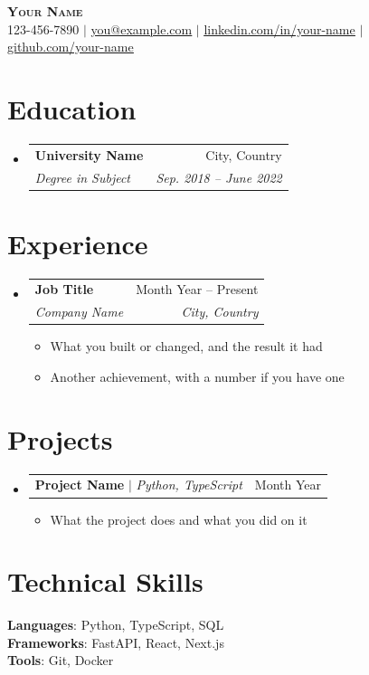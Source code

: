 \documentclass[letterpaper,11pt]{article}
\makeatletter
\newcommand{\resumeItem}[1]{
  \item\small{
    {#1 \vspace{-2pt}}
  }
}
\newcommand{\resumeSubheading}[4]{
  \vspace{-2pt}\item
    \begin{tabular*}{0.97\textwidth}[t]{l@{\extracolsep{\fill}}r}
      \textbf{#1} & #2 \\
      \textit{\small#3} & \textit{\small #4} \\
    \end{tabular*}\vspace{-7pt}
}
\newcommand{\resumeProjectHeading}[2]{
    \item
    \begin{tabular*}{0.97\textwidth}{l@{\extracolsep{\fill}}r}
      \small#1 & #2 \\
    \end{tabular*}\vspace{-7pt}
}
\newcommand{\resumeSubHeadingListStart}{\begin{itemize}[leftmargin=0.15in, label={}]}
\newcommand{\resumeSubHeadingListEnd}{\end{itemize}}
\newcommand{\resumeItemListStart}{\begin{itemize}}
\newcommand{\resumeItemListEnd}{\end{itemize}\vspace{-5pt}}
\makeatother
\begin{document}
\begin{center}
    \textbf{\Huge \scshape Your Name} \\ \vspace{1pt}
    \small 123-456-7890 $|$ \href{mailto:you@example.com}{\underline{you@example.com}} $|$
    \href{https://linkedin.com/in/your-name}{\underline{linkedin.com/in/your-name}} $|$
    \href{https://github.com/your-name}{\underline{github.com/your-name}}
\end{center}


\section{Education}
  \resumeSubHeadingListStart
    \resumeSubheading
      {University Name}{City, Country}
      {Degree in Subject}{Sep. 2018 -- June 2022}
  \resumeSubHeadingListEnd


\section{Experience}
  \resumeSubHeadingListStart

    \resumeSubheading
      {Job Title}{Month Year -- Present}
      {Company Name}{City, Country}
      \resumeItemListStart
        \resumeItem{What you built or changed, and the result it had}
        \resumeItem{Another achievement, with a number if you have one}
      \resumeItemListEnd

  \resumeSubHeadingListEnd


\section{Projects}
    \resumeSubHeadingListStart
      \resumeProjectHeading
          {\textbf{Project Name} $|$ \emph{Python, TypeScript}}{Month Year}
          \resumeItemListStart
            \resumeItem{What the project does and what you did on it}
          \resumeItemListEnd
    \resumeSubHeadingListEnd


\section{Technical Skills}
 \begin{itemize}[leftmargin=0.15in, label={}]
    \small{\item{
     \textbf{Languages}{: Python, TypeScript, SQL} \\
     \textbf{Frameworks}{: FastAPI, React, Next.js} \\
     \textbf{Tools}{: Git, Docker} \\
    }}
 \end{itemize}


\end{document}

